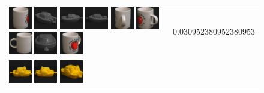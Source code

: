 \begin{figure}[tbp]
\begin{center}
\begin{tabular}{m{11cm} | m{3cm} |}
\includegraphics[width=1cm]{coil/beeld-38.eps}
\includegraphics[width=1cm]{coil/beeld-25.eps}
\includegraphics[width=1cm]{coil/beeld-27.eps}
\includegraphics[width=1cm]{coil/beeld-24.eps}
\includegraphics[width=1cm]{coil/beeld-41.eps}
\includegraphics[width=1cm]{coil/beeld-40.eps}
\includegraphics[width=1cm]{coil/beeld-37.eps}
\includegraphics[width=1cm]{coil/beeld-28.eps}
\includegraphics[width=1cm]{coil/beeld-39.eps}
& {\scriptsize 0.030952380952380953}
\\
\includegraphics[width=1cm]{coil/beeld-12.eps}
\includegraphics[width=1cm]{coil/beeld-13.eps}
\includegraphics[width=1cm]{coil/beeld-16.eps}

\end{tabular}
\end{center}
\end{figure}

